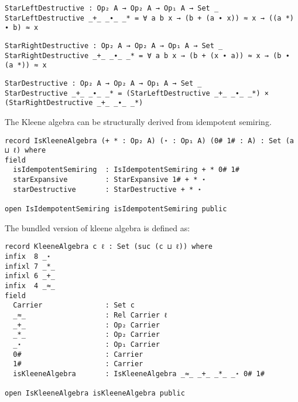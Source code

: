 \begin{verbatim}
StarLeftDestructive : Op₂ A → Op₂ A → Op₁ A → Set _
StarLeftDestructive _+_ _∙_ _* = ∀ a b x → (b + (a ∙ x)) ≈ x → ((a *) ∙ b) ≈ x
\end{verbatim}
\begin{verbatim}
StarRightDestructive : Op₂ A → Op₂ A → Op₁ A → Set _
StarRightDestructive _+_ _∙_ _* = ∀ a b x → (b + (x ∙ a)) ≈ x → (b ∙ (a *)) ≈ x
\end{verbatim}
\begin{verbatim}
StarDestructive : Op₂ A → Op₂ A → Op₁ A → Set _
StarDestructive _+_ _∙_ _* = (StarLeftDestructive _+_ _∙_ _*) × (StarRightDestructive _+_ _∙_ _*)
\end{verbatim}
The Kleene algebra can be structurally derived from idempotent semiring. 
\begin{verbatim}
record IsKleeneAlgebra (+ * : Op₂ A) (⋆ : Op₁ A) (0# 1# : A) : Set (a ⊔ ℓ) where
field
  isIdempotentSemiring  : IsIdempotentSemiring + * 0# 1#
  starExpansive         : StarExpansive 1# + * ⋆
  starDestructive       : StarDestructive + * ⋆

open IsIdempotentSemiring isIdempotentSemiring public
\end{verbatim}
The bundled version of kleene algebra is defined as: 
\begin{verbatim}
record KleeneAlgebra c ℓ : Set (suc (c ⊔ ℓ)) where
infix  8 _⋆
infixl 7 _*_
infixl 6 _+_
infix  4 _≈_
field
  Carrier               : Set c
  _≈_                   : Rel Carrier ℓ
  _+_                   : Op₂ Carrier
  _*_                   : Op₂ Carrier
  _⋆                    : Op₁ Carrier
  0#                    : Carrier
  1#                    : Carrier
  isKleeneAlgebra       : IsKleeneAlgebra _≈_ _+_ _*_ _⋆ 0# 1#

open IsKleeneAlgebra isKleeneAlgebra public
\end{verbatim}
